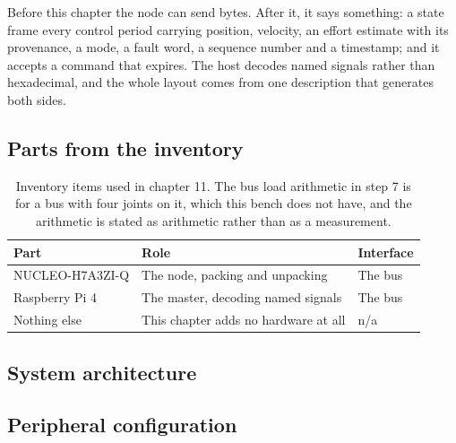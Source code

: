 Before this chapter the node can send bytes. After it, it says something: a
state frame every control period carrying position, velocity, an effort estimate
with its provenance, a mode, a fault word, a sequence number and a timestamp;
and it accepts a command that expires. The host decodes named signals rather
than hexadecimal, and the whole layout comes from one description that generates
both sides.

\subsection*{Parts from the inventory}

\begin{table}[H]\centering\small
\begin{tabular}{p{40mm}p{66mm}p{40mm}}
\toprule
Part & Role & Interface \\
\midrule
NUCLEO-H7A3ZI-Q & The node, packing and unpacking & The bus \\
Raspberry Pi 4 & The master, decoding named signals & The bus \\
Nothing else & This chapter adds no hardware at all & n/a \\
\bottomrule
\end{tabular}
\caption{Inventory items used in chapter 11. The bus load arithmetic in step 7 is for a bus with four joints on it, which this bench does not have, and the arithmetic is stated as arithmetic rather than as a measurement.}
\end{table}

\subsection*{System architecture}


\subsection*{Peripheral configuration}


